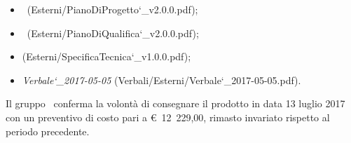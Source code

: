 \documentclass[a4paper,12pt]{article}
\begin{document}
\begin{titlepage}
\begin{itemize}
			\item \pianodiprogettoRP\ (Esterni/PianoDiProgetto\char`_v2.0.0.pdf);
			\item \pianodiqualificaRP\ (Esterni/PianoDiQualifica\char`_v2.0.0.pdf);
			\item \specificatecnicaRP (Esterni/SpecificaTecnica\char`_v1.0.0.pdf);			
			\item \textit{Verbale\char`_2017-05-05} (Verbali/Esterni/Verbale\char`_2017-05-05.pdf).
		\end{itemize}	
		Il gruppo \kaleidoscode\ conferma la volontà di consegnare il prodotto in data 13 luglio 2017
		 con un preventivo di costo pari a \hbox{\euro\ 12 229,00},
		  rimasto invariato rispetto al periodo precedente.\\ 
		

\end{titlepage}
\end{document}
